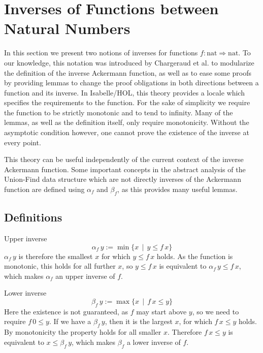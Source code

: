 \documentclass[headsepline,footsepline,footinclude=false,oneside,fontsize=11pt,paper=a4,listof=totoc,bibliography=totoc]{scrbook} %
\begin{document}
\section{Inverses of Functions between Natural Numbers}

In this section we present two notions of inverses for functions $f: \mathrm{nat} \Rightarrow \mathrm{nat}$. To our knowledge, this notation was introduced by Chargeraud et al. \cite{chargueraud17} to modularize the definition of the inverse Ackermann function, as well as to ease some proofs by providing lemmas to change the proof obligations in both directions between a function and its inverse.
In Isabelle/HOL, this theory provides a locale which specifies the requirements to the function. For the sake of simplicity we require the function to be strictly monotonic and to tend to infinity. Many of the lemmas, as well as the definition itself, only require monotonicity. Without the asymptotic condition however, one cannot prove the existence of the inverse at every point.

This theory can be useful independently of the current context of the inverse Ackermann function. Some important concepts in the abstract analysis of the Union-Find data structure which are not directly inverses of the Ackermann function are defined using $\alpha_f$ and $\beta_f$, as this provides many useful lemmas.

\subsection{Definitions}

\begin{definition}{Upper inverse}
	\begin{equation}
	\alpha_f \, y := \min\{x \, \mid \, y \le f\, x\}
	\end{equation}
	$\alpha_f\, y$ is therefore the smallest $x$ for which $y \le f\, x$ holds. As the function is monotonic, this holds for all further $x$, so $y \le f\, x$ is equivalent to $\alpha_f \,y \le f\,x$, which makes $\alpha_f$ an upper inverse of $f$.
\end{definition}

\begin{definition}{Lower inverse}
	\begin{equation}
	\beta_f \, y := \max\{x \, \mid \, f\,x \le y \}
	\end{equation}
	Here the existence is not guaranteed, as $f$ may start above $y$, so we need to require $f\,0 \le y$. If we have a $\beta_f\,y$, then it is the largest $x$, for which $f\,x\le y$ holds. By monotonicity the property holds for all smaller $x$. Therefore $f\,x \le y$ is equivalent to $x \le \beta_f\,y$, which makes $\beta_f$ a lower inverse of $f$.
\end{definition}
\end{document}
